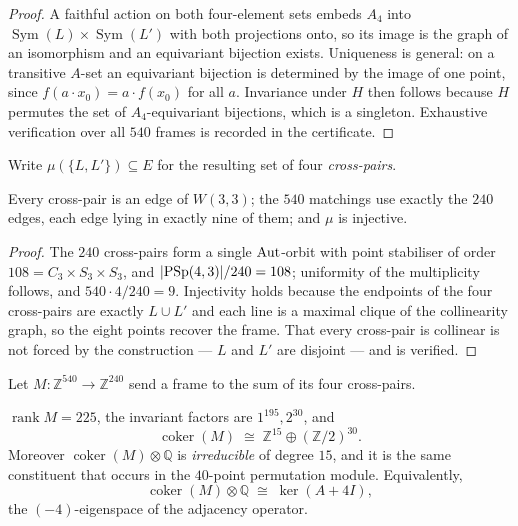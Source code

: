\begin{proof}
A faithful action on both four-element sets embeds $A_4$ into
$\operatorname{Sym}(L)\times\operatorname{Sym}(L')$ with both projections onto,
so its image is the graph of an isomorphism and an equivariant bijection exists.
Uniqueness is general: on a transitive $A$-set an equivariant bijection is
determined by the image of one point, since
$f(a\cdot x_0)=a\cdot f(x_0)$ for all $a$. Invariance under $H$ then follows
because $H$ permutes the set of $A_4$-equivariant bijections, which is a
singleton. Exhaustive verification over all $540$ frames is recorded in the
certificate.
\end{proof}

Write $\mu(\{L,L'\})\subseteq E$ for the resulting set of four \emph{cross-pairs}.

\begin{theorem}\label{thm:crossedges}
Every cross-pair is an edge of $W(3,3)$; the $540$ matchings use exactly the
$240$ edges, each edge lying in exactly nine of them; and $\mu$ is injective.
\end{theorem}

\begin{proof}
The $240$ cross-pairs form a single $\mathrm{Aut}$-orbit with point stabiliser of order
$108=C_3\times S_3\times S_3$, and $|\mathrm{PSp}(4,3)|/240=108$; uniformity of the
multiplicity follows, and $540\cdot 4/240=9$. Injectivity holds because the
endpoints of the four cross-pairs are exactly $L\cup L'$ and each line is a
maximal clique of the collinearity graph, so the eight points recover the frame.
That every cross-pair is collinear is not forced by the construction --- $L$ and
$L'$ are disjoint --- and is verified.
\end{proof}

Let $M\colon \mathbb{Z}^{540}\to\mathbb{Z}^{240}$ send a frame to the sum of its
four cross-pairs.

\begin{theorem}[Cokernel]\label{thm:crosscoker}
$\operatorname{rank} M=225$, the invariant factors are $1^{195},2^{30}$, and
\[
  \operatorname{coker}(M)\;\cong\;\mathbb{Z}^{15}\oplus(\mathbb{Z}/2)^{30}.
\]
Moreover $\operatorname{coker}(M)\otimes\mathbb{Q}$ is \emph{irreducible} of
degree $15$, and it is the same constituent that occurs in the $40$-point
permutation module. Equivalently,
\[
  \operatorname{coker}(M)\otimes\mathbb{Q}\;\cong\;\ker(A+4I),
\]
the $(-4)$-eigenspace of the adjacency operator.
\end{theorem}

